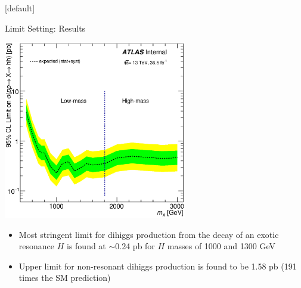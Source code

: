 \documentclass{beamer}
\begin{document}
{  \makeatletter %
  [default]
  \def\beamer@entrycode{\vspace*{-1.075\headheight}}
  \begin{frame}{Limit Setting: Results}
    \vspace{-10pt}
    \begin{center}
      \includegraphics*[width=0.60\textwidth] {../chapters/dihiggs2/figures/limit_2016_TopQCDcr_NoCacc_MuQcdCr_Smooth_xSec_exp_170508_00.eps}
    \end{center}
    \vspace{-20pt}
    \begin{itemize}
    \item Most stringent limit for dihiggs production from the decay of an exotic resonance $H$ is found at $\sim$0.24 pb for $H$ masses of 1000 and 1300 GeV
    \item Upper limit for non-resonant dihiggs production is found to be 1.58 pb (191 times the SM prediction)
    \end{itemize}
  \end{frame}
}
\end{document}
